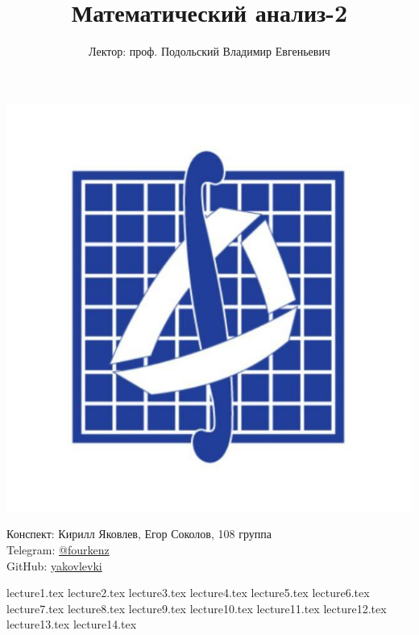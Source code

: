\documentclass[a4paper, 12pt]{article}
\title{\textbf{Математический анализ-2}}
\author{Лектор: проф. Подольский Владимир Евгеньевич}
\begin{document}
    
\fontsize{14pt}{20pt}\selectfont
\maketitle
\vspace{0.3cm}
\begin{center}
    \includegraphics[width=0.75\linewidth]{Images/mehmat.png}
\end{center}
\vspace{1.5cm}
\begin{center}
    Конспект: Кирилл Яковлев, Егор Соколов, 108 группа\\
    Telegram: \href{https://t.me/fourkenz}{@fourkenz}\\
    GitHub: \href{https://github.com/yakovlevki}{yakovlevki}\\
\end{center}
    
\newpage
\tableofcontents
\newpage

{lecture1.tex}
{lecture2.tex}
{lecture3.tex}
{lecture4.tex}
{lecture5.tex}
{lecture6.tex}
{lecture7.tex}
{lecture8.tex}
{lecture9.tex}
{lecture10.tex}
{lecture11.tex}
{lecture12.tex}
{lecture13.tex}
{lecture14.tex}
\end{document}
